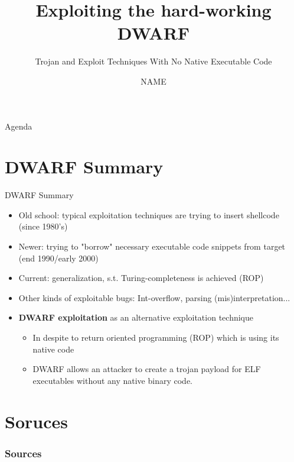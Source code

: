\documentclass[11pt%
,aspectratio=169%
]{beamer}
\author{NAME}
\title[DWARF Hacking]{Exploiting the hard-working DWARF}
\subtitle[Exploiting Excecption Handlers]{Trojan and Exploit Techniques With No Native Executable Code}
\institute[FU Berlin]{Freie Universität Berlin}
\begin{document}
\begin{frame}
\titlepage
\end{frame}

\begin{frame}{Agenda}
\tableofcontents[hideothersubsections]
\end{frame}

\section*{DWARF Summary}
\begin{frame}{DWARF Summary}
	\begin{itemize}
		\item Old school: typical exploitation techniques are trying to insert shellcode (since 1980's)
		\item Newer: trying to "borrow" necessary executable code snippets from target (end 1990/early 2000)
		\item Current: generalization, s.t. Turing-completeness is achieved (ROP)
		\item Other kinds of exploitable bugs: Int-overflow, parsing (mis)interpretation...
		\item \textbf{DWARF exploitation} as an alternative exploitation technique
		\begin{itemize}
			\item In despite to return oriented programming (ROP) which is using its native code
			\item DWARF allows an attacker to create a trojan payload for ELF executables without any native binary code.
		\end{itemize}
	\end{itemize}
\end{frame}



\section{Soruces}
\appendix
\begin{frame}[allowframebreaks]
  \frametitle<presentation>{Sources}


\end{frame}
\end{document}
